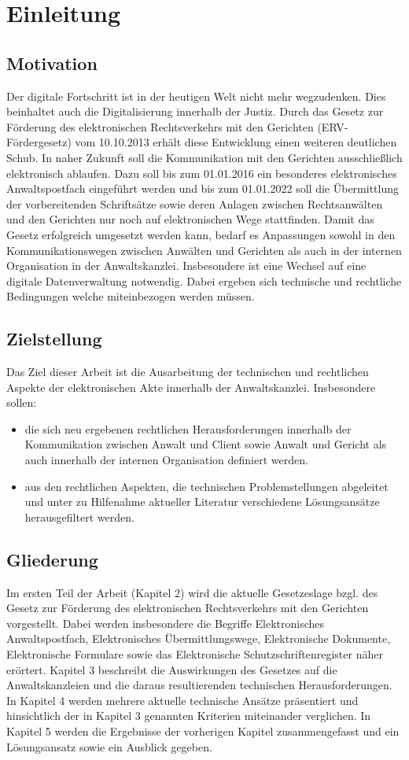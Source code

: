 \section{Einleitung}

\subsection*{Motivation}
Der digitale Fortschritt ist in der heutigen Welt nicht mehr wegzudenken. Dies beinhaltet auch die Digitalisierung innerhalb der Justiz. Durch das Gesetz zur Förderung des elektronischen Rechtsverkehrs mit den Gerichten (ERV-Fördergesetz) vom 10.10.2013 erhält diese Entwicklung einen weiteren deutlichen Schub. In naher Zukunft soll die Kommunikation mit den Gerichten ausschließlich elektronisch ablaufen. Dazu soll bis zum 01.01.2016 ein besonderes elektronisches Anwaltspostfach eingeführt werden und bis zum 01.01.2022 soll die Übermittlung der vorbereitenden Schriftsätze sowie deren Anlagen zwischen Rechtsanwälten und den Gerichten nur noch auf elektronischen Wege stattfinden. 
Damit das Gesetz erfolgreich umgesetzt werden kann, bedarf es Anpassungen sowohl in den Kommunikationswegen zwischen Anwälten und Gerichten als auch in der internen Organisation in der Anwaltskanzlei. Insbesondere ist eine Wechsel auf eine digitale Datenverwaltung notwendig. Dabei ergeben sich technische und rechtliche Bedingungen welche miteinbezogen werden müssen.  

\subsection*{Zielstellung}
Das Ziel dieser Arbeit ist die Ausarbeitung der technischen und rechtlichen Aspekte der elektronischen Akte innerhalb der Anwaltskanzlei. Insbesondere sollen:
\begin{itemize}
\item die sich neu ergebenen rechtlichen Herausforderungen innerhalb der Kommunikation zwischen Anwalt und Client sowie Anwalt und Gericht als auch innerhalb der internen Organisation definiert werden.
\item aus den rechtlichen Aspekten, die technischen Problemstellungen abgeleitet und unter zu Hilfenahme aktueller Literatur verschiedene Lösungsansätze herausgefiltert werden.
\end{itemize} 
\subsection*{Gliederung}
Im ersten Teil der Arbeit (Kapitel 2) wird die aktuelle Gesetzeslage bzgl. des Gesetz zur Förderung des elektronischen Rechtsverkehrs mit den Gerichten vorgestellt. Dabei werden insbesondere die Begriffe Elektronisches Anwaltspostfach, Elektronisches Übermittlungswege, Elektronische Dokumente, Elektronische Formulare sowie das Elektronische Schutzschriftenregister näher erörtert. Kapitel 3 beschreibt die Auswirkungen des Gesetzes auf die Anwaltskanzleien und die daraus resultierenden technischen Herausforderungen. In Kapitel 4 werden mehrere aktuelle technische Ansätze präsentiert und hinsichtlich der in Kapitel 3 genannten Kriterien miteinander verglichen. In Kapitel 5 werden die Ergebnisse der vorherigen Kapitel zusammengefasst und ein Lösungsansatz sowie ein Ausblick gegeben. 
